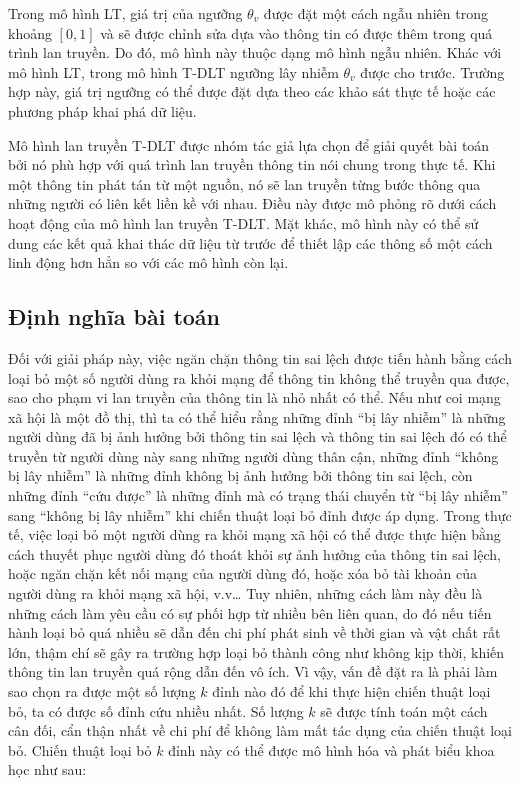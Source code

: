 Trong mô hình LT, giá trị của ngưỡng $\theta_{v}$ được đặt một cách ngẫu nhiên trong khoảng $[0,1]$ và sẽ được chỉnh sửa dựa vào thông tin có được thêm trong quá trình lan truyền. Do đó, mô hình này thuộc dạng mô hình ngẫu nhiên. Khác với mô hình LT, trong mô hình T-DLT ngưỡng lây nhiễm $\theta_{v}$ được cho trước. Trường hợp này, giá trị ngưỡng có thể được đặt dựa theo các khảo sát thực tế hoặc các phương pháp khai phá dữ liệu.

Mô hình lan truyền T-DLT được nhóm tác giả lựa chọn để giải quyết bài toán bởi nó phù hợp với quá trình lan truyền thông tin nói chung trong thực tế. Khi một thông tin phát tán từ một nguồn, nó sẽ lan truyền từng bước thông qua những người có liên kết liền kề với nhau. Điều này được mô phỏng rõ dưới cách hoạt động của mô hình lan truyền T-DLT. Mặt khác, mô hình này có thể sử dung các kết quả khai thác dữ liệu từ trước để thiết lập các thông số một cách linh động hơn hẳn so với các mô hình còn lại.

\subsection{Định nghĩa bài toán}
Đối với giải pháp này, việc ngăn chặn thông tin sai lệch được tiến hành bằng cách loại bỏ một số người dùng ra khỏi mạng để thông tin không thể truyền qua được, sao cho phạm vi lan truyền của thông tin là nhỏ nhất có thể. Nếu như coi mạng xã hội là một đồ thị, thì ta có thể hiểu rằng những đỉnh “bị lây nhiễm” là những người dùng đã bị ảnh hưởng bởi thông tin sai lệch và thông tin sai lệch đó có thể truyền từ người dùng này sang những người dùng thân cận, những đỉnh “không bị lây nhiễm” là những đỉnh không bị ảnh hưởng bởi thông tin sai lệch, còn những đỉnh “cứu được” là những đỉnh mà có trạng thái chuyển từ “bị lây nhiễm” sang “không bị lây nhiễm” khi chiến thuật loại bỏ đỉnh được áp dụng. Trong thực tế, việc loại bỏ một người dùng ra khỏi mạng xã hội có thể được thực hiện bằng cách thuyết phục người dùng đó thoát khỏi sự ảnh hưởng của thông tin sai lệch, hoặc ngăn chặn kết nối mạng của người dùng đó, hoặc xóa bỏ tài khoản của người dùng ra khỏi mạng xã hội, v.v… Tuy nhiên, những cách làm này đều là những cách làm yêu cầu có sự phối hợp từ nhiều bên liên quan, do đó nếu tiến hành loại bỏ quá nhiều sẽ dẫn đến chi phí phát sinh về thời gian và vật chất rất lớn, thậm chí sẽ gây ra trường hợp loại bỏ thành công như không kịp thời, khiến thông tin lan truyền quá rộng dẫn đến vô ích. Vì vậy, vấn đề đặt ra là phải làm sao chọn ra được một số lượng $k$ đỉnh nào đó để khi thực hiện chiến thuật loại bỏ, ta có được số đỉnh cứu nhiều nhất. Số lượng $k$ sẽ được tính toán một cách cân đối, cẩn thận nhất về chi phí để không làm mất tác dụng của chiến thuật loại bỏ. Chiến thuật loại bỏ $k$ đỉnh này có thể được mô hình hóa và phát biểu khoa học như sau:  

